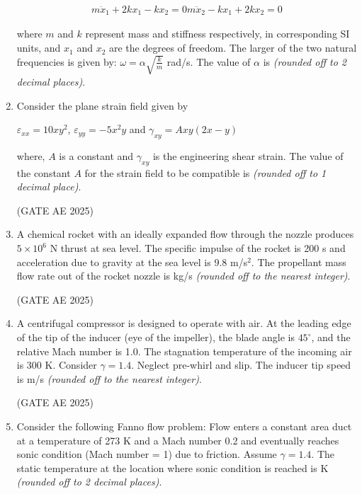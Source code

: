 \documentclass[journal,12pt,onecolumn]{IEEEtran}
\theoremstyle{remark}
\begin{document}
\begin{flushleft}
\begin{enumerate}
\begin{align*}
m\ddot{x}_1 + 2kx_1 - kx_2 = 0


m\ddot{x}_2 - kx_1 + 2kx_2 = 0
\end{align*}

where $m$ and $k$ represent mass and stiffness respectively, in corresponding SI units, and $x_1$ and $x_2$ are the degrees of freedom. The larger of the two natural frequencies is given by: $\omega = \alpha \sqrt{\frac{k}{m}}$ rad/s. The value of $\alpha$ is \underline{\hspace{3cm}} \textit{(rounded off to 2 decimal places)}.

\item Consider the plane strain field given by  

\begin{center}
    $\varepsilon_{xx} = 10xy^2$, \quad $\varepsilon_{yy} = -5x^2y$ \quad and \quad $\gamma_{xy} = Axy(2x-y)$ 
\end{center}

where, $A$ is a constant and $\gamma_{xy}$ is the engineering shear strain. The value of the constant $A$ for the strain field to be compatible is \underline{\hspace{3cm}} \textit{(rounded off to 1 decimal place)}.

\hfill (GATE AE 2025)

\item A chemical rocket with an ideally expanded flow through the nozzle produces $5\times 10^6$ N thrust at sea level. The specific impulse of the rocket is 200 s and acceleration due to gravity at the sea level is 9.8 m/s$^2$. The propellant mass flow rate out of the rocket nozzle is \underline{\hspace{3cm}} kg/s \textit{(rounded off to the nearest integer)}.

\hfill (GATE AE 2025)

\item A centrifugal compressor is designed to operate with air. At the leading edge of the tip of the inducer (eye of the impeller), the blade angle is $45^\circ$, and the relative Mach number is 1.0. The stagnation temperature of the incoming air is 300 K. Consider $\gamma = 1.4$. Neglect pre-whirl and slip. The inducer tip speed is \underline{\hspace{3cm}} m/s \textit{(rounded off to the nearest integer)}.

\hfill (GATE AE 2025)

\item Consider the following Fanno flow problem: Flow enters a constant area duct at a temperature of 273 K and a Mach number 0.2 and eventually reaches sonic condition (Mach number = 1) due to friction. Assume $\gamma = 1.4$. The static temperature at the location where sonic condition is reached is \underline{\hspace{3cm}} K \textit{(rounded off to 2 decimal places)}.


\end{enumerate}
\end{flushleft}
\end{document}
